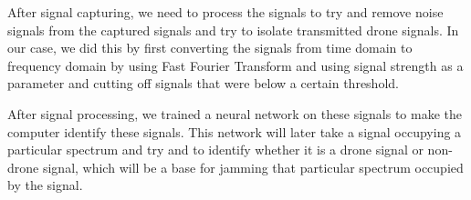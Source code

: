 \noindent After signal capturing, we need to process the signals to try and remove noise signals from the captured signals and try to isolate transmitted drone signals. In our case, we did this by first converting the signals from time domain to frequency domain by using Fast Fourier Transform and using signal strength as a parameter and cutting off signals that were below a certain threshold. 


\noindent After signal processing, we trained a neural network on these signals to make the computer identify these signals. This network will later take a signal occupying a particular spectrum and try and to identify whether it is a drone signal or non-drone signal, which will be a base for jamming that particular spectrum occupied by  the signal.
